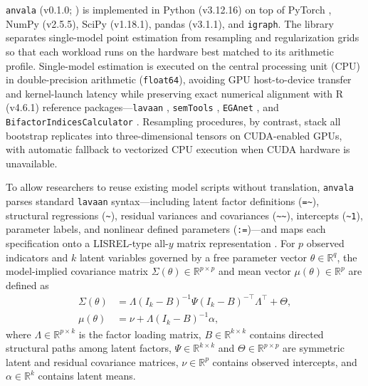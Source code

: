 ﻿\documentclass[12pt,letterpaper]{article}
\begin{document}
\texttt{anvala} (v0.1.0; \parencite{pedrosa2026}) is implemented in Python (v3.12.16) on top of PyTorch \parencite[v2.6.0;][]{paszke2019}, NumPy (v2.5.5), SciPy (v1.18.1), pandas (v3.1.1), and \texttt{igraph}. The library separates single-model point estimation from resampling and regularization grids so that each workload runs on the hardware best matched to its arithmetic profile. Single-model estimation is executed on the central processing unit (CPU) in double-precision arithmetic (\texttt{float64}), avoiding GPU host-to-device transfer and kernel-launch latency while preserving exact numerical alignment with R (v4.6.1) reference packages---\texttt{lavaan} \parencite[v0.7-2;][]{rosseel2012}, \texttt{semTools} \parencite[v0.5-9;][]{jorgensen2026}, \texttt{EGAnet} \parencite[v2.4.1;][]{golino2017}, and \texttt{BifactorIndicesCalculator} \parencite[v0.2.2;][]{dueber2021}. Resampling procedures, by contrast, stack all bootstrap replicates into three-dimensional tensors on CUDA-enabled GPUs, with automatic fallback to vectorized CPU execution when CUDA hardware is unavailable.

To allow researchers to reuse existing model scripts without translation, \texttt{anvala} parses standard \texttt{lavaan} syntax---including latent factor definitions (\texttt{=\textasciitilde}), structural regressions (\texttt{\textasciitilde}), residual variances and covariances (\texttt{\textasciitilde\textasciitilde}), intercepts (\texttt{\textasciitilde 1}), parameter labels, and nonlinear defined parameters (\texttt{:=})---and maps each specification onto a LISREL-type all-$y$ matrix representation \parencite{bollen1989}. For $p$ observed indicators and $k$ latent variables governed by a free parameter vector $\theta \in \mathbb{R}^{q}$, the model-implied covariance matrix $\Sigma(\theta) \in \mathbb{R}^{p \times p}$ and mean vector $\mu(\theta) \in \mathbb{R}^{p}$ are defined as
\begin{align}
\Sigma(\theta) &= \Lambda (I_k - B)^{-1} \Psi (I_k - B)^{-\top} \Lambda^{\top} + \Theta, \label{eq:sigma} \\
\mu(\theta) &= \nu + \Lambda (I_k - B)^{-1} \alpha, \label{eq:mu}
\end{align}
where $\Lambda \in \mathbb{R}^{p \times k}$ is the factor loading matrix, $B \in \mathbb{R}^{k \times k}$ contains directed structural paths among latent factors, $\Psi \in \mathbb{R}^{k \times k}$ and $\Theta \in \mathbb{R}^{p \times p}$ are symmetric latent and residual covariance matrices, $\nu \in \mathbb{R}^{p}$ contains observed intercepts, and $\alpha \in \mathbb{R}^{k}$ contains latent means.
\end{document}
